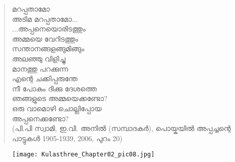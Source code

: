 \begin{tcolorbox}[%
  breakable, %
  arc=0mm, 
  left=1pt, right = 1pt, 
  boxrule=0mm,
  colback = {blue!10}, %
]
\begin{quote}{}
മറപ്പതാമോ\\
അടിമ മറപ്പതാമോ...\\
...അപ്പനെയൊരിടത്തും\\
അമ്മയെ വേറിടത്തും\\
സന്താനങ്ങളങ്ങുമിങ്ങും\\
അലഞ്ഞു വിളിച്ചു\\
മാനത്തു പറക്കുന്ന\\
എന്റെ ചക്കിപ്പരുന്തേ\\
നീ പോകും ദിക്കു ദേശത്തെ\\
ഞങ്ങളുടെ അമ്മയെക്കണ്ടോ?\\
ഒരു വാമൊഴി ചൊല്ലിപ്പോയ\\
അപ്പനെക്കണ്ടോ?\\
(പി.പി സ്വാമി, ഇ.വി. അനിൽ (സമ്പാദകർ), പൊയ്കയിൽ അപ്പച്ചന്റെ പാട്ടുകൾ 1905-1939, 2006, പുറം 20)
\end{quote}
\end{tcolorbox}

\begin{figure}[h]
\begin{center}
\texttt{[image: Kulasthree\_Chapter02\_pic08.jpg]}
\end{center}
\end{figure}

